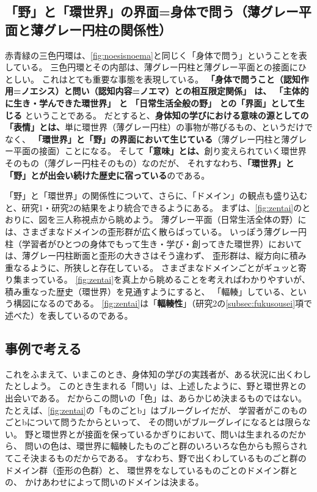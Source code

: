 \subsection{「野」と「環世界」の界面=身体で問う（薄グレー平面と薄グレー円柱の関係性）}
\label{subsec:grayheimenuandgrayenchu}
赤青緑の三色円環は、\autoref{fig:noesisnoema}と同じく「身体で問う」ということを表している。
三色円環とその内部は、薄グレー円柱と薄グレー平面との接面にひとしい。
これはとても重要な事態を表現している。
\textbf{
  「身体で問うこと（認知作用=ノエシス）と問い（認知内容=ノエマ）との相互限定関係」
  は、
  「主体的に生き・学んできた環世界」
  と
  「日常生活全般の野」
  との「界面」として生じる
  }
ということである。
だとすると、\textbf{身体知の学びにおける意味の源としての「表情」とは、}単に環世界（薄グレー円柱）の事物が帯びるもの、というだけでなく、
\textbf{「環世界」と「野」の界面において生じている}（薄グレー円柱と薄グレー平面の接面）ことになる。
そして\textbf{「意味」とは、}創り変えられていく環世界そのもの（薄グレー円柱そのもの）なのだが、
それすなわち、\textbf{「環世界」と「野」とが出会い続けた歴史に宿っている}のである。

「野」と「環世界」の関係性について、さらに、「ドメイン」の観点も盛り込むと、研究1・研究2の結果をより統合できるようにある。
まずは、\autoref{fig:zentai}のとおりに、図を三人称視点から眺めよう。
薄グレー平面（日常生活全体の野）には、さまざまなドメインの歪形群が広く散らばっている。
いっぽう薄グレー円柱（学習者がひとつの身体でもって生き・学び・創ってきた環世界）においては、薄グレー円柱断面と歪形の大きさはそう違わず、
歪形群は、縦方向に積み重なるように、所狭しと存在している。
さまざまなドメインごとがギュッと寄り集まっている。
\autoref{fig:zentai}を真上から眺めることを考えればわかりやすいが、
積み重なった歴史（環世界）を見通すようにすると、
「輻輳」している、という構図になるのである。
\autoref{fig:zentai}は「\textbf{輻輳性}」（研究2の\ref{subsec:fukusousei}項で述べた）を表しているのである。



\subsection{事例で考える}
これをふまえて、いまこのとき、身体知の学びの実践者が、ある状況に出くわしたとしよう。
このとき生まれる「問い」は、上述したように、野と環世界との出会いである。
だからこの問いの「色」は、あらかじめ決まるものではない。
たとえば、\autoref{fig:zentai}の「ものごとb」はブルーグレイだが、
学習者がこのものごとbについて問うたからといって、
その問いがブルーグレイになるとは限らない。
野と環世界とが接面を保っているかぎりにおいて、問いは生まれるのだから、
問いの色は、環世界に輻輳したものごと群のいろいろな色からも照らされてこそ決まるものだからである。
すなわち、野で出くわしているものごと群のドメイン群（歪形の色群）と、
環世界をなしているものごとのドメイン群との、
かけあわせによって問いのドメインは決まる。

